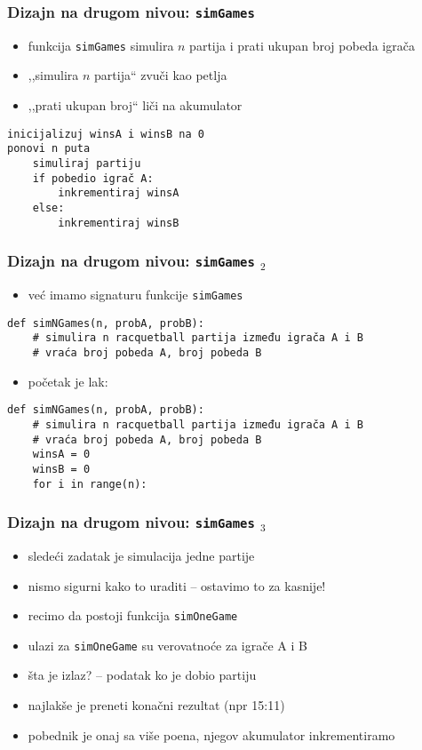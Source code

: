 \documentclass[utf8,compress,aspectratio=169]{beamer}
\begin{document}
\begin{frame}[fragile]
  \frametitle{Dizajn na drugom nivou: \texttt{simGames}}
  \begin{itemize}
    \item funkcija \texttt{simGames} simulira $n$ partija i prati ukupan broj pobeda igrača
    \item ,,simulira $n$ partija`` zvuči kao petlja
    \item ,,prati ukupan broj`` liči na akumulator
  \end{itemize}
\begin{verbatim}
inicijalizuj winsA i winsB na 0
ponovi n puta
    simuliraj partiju
    if pobedio igrač A:
        inkrementiraj winsA
    else:
        inkrementiraj winsB
\end{verbatim}
\end{frame}

\begin{frame}[fragile]
  \frametitle{Dizajn na drugom nivou: \texttt{simGames} $_2$}
  \begin{itemize}
    \item već imamo signaturu funkcije \texttt{simGames}
  \end{itemize}
\begin{verbatim}
def simNGames(n, probA, probB):
    # simulira n racquetball partija između igrača A i B
    # vraća broj pobeda A, broj pobeda B
\end{verbatim}
  \begin{itemize}
    \item početak je lak:
  \end{itemize}
\begin{verbatim}
def simNGames(n, probA, probB):
    # simulira n racquetball partija između igrača A i B
    # vraća broj pobeda A, broj pobeda B
    winsA = 0
    winsB = 0
    for i in range(n):
\end{verbatim}
\end{frame}

\begin{frame}[fragile]
  \frametitle{Dizajn na drugom nivou: \texttt{simGames} $_3$}
  \begin{itemize}
    \item sledeći zadatak je simulacija jedne partije
    \item nismo sigurni kako to uraditi -- ostavimo to za kasnije!
    \item recimo da postoji funkcija \texttt{simOneGame}
    \item ulazi za \texttt{simOneGame} su verovatnoće za igrače A i B
    \item šta je izlaz? -- podatak ko je dobio partiju
    \item najlakše je preneti konačni rezultat (npr 15:11)
    \item pobednik je onaj sa više poena, njegov akumulator inkrementiramo
  \end{itemize}
\end{frame}
\end{document}
